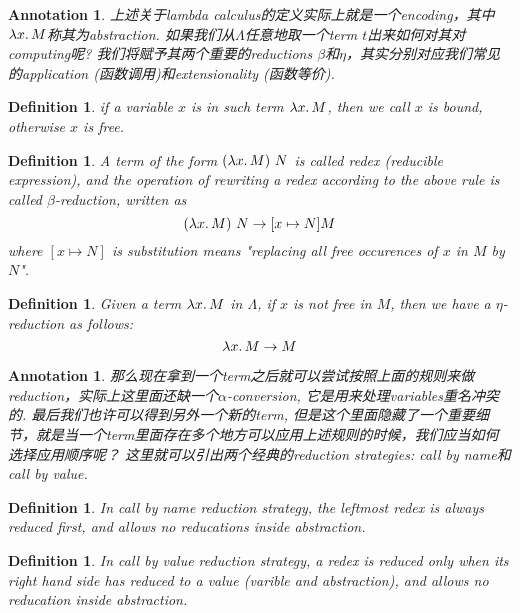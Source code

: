 \documentclass{article}
\newtheorem{definition}[theorem]{Definition}
\newtheorem{annotation}[theorem]{Annotation}
\newcommand{\lam}[2]{\ensuremath{\lambda #1\ldotp #2}} %
\begin{document}
\begin{annotation}
\rm 上述关于lambda calculus的定义实际上就是一个encoding，其中$\lam{x}{M}$称其为abstraction. 如果我们从$\Lambda$任意地取一个term $t$出来如何对其对computing呢? 我们将赋予其两个重要的reductions $\beta$和$\eta$，其实分别对应我们常见的application (函数调用)和extensionality (函数等价).
\end{annotation}

\begin{definition}
\rm if a variable $x$ is in such term $\lam{x}{M}$, then we call $x$ is bound, otherwise $x$ is free. 
\end{definition}

\begin{definition}
\rm A term of the form $(\lam{x}{M})~N$ is called redex (reducible expression), and the operation of rewriting a redex according to the above rule is called $\beta$-reduction, written as
\[
	(\lam{x}{M})~N \to [x \mapsto N] M
\]
where $[x \mapsto N]$ is substitution means "replacing all free occurences of $x$ in $M$ by $N$".
\end{definition}

\begin{definition}
\rm Given a term $\lam{x}{M}$ in $\Lambda$, if $x$ is not free in $M$, then we have a $\eta$-reduction as follows:
\[
	\lam{x}{M} \to M
\]  
\end{definition}

\begin{annotation}
\rm 那么现在拿到一个term之后就可以尝试按照上面的规则来做reduction，实际上这里面还缺一个$\alpha$-conversion, 它是用来处理variables重名冲突的. 最后我们也许可以得到另外一个新的term, 但是这个里面隐藏了一个重要细节，就是当一个term里面存在多个地方可以应用上述规则的时候，我们应当如何选择应用顺序呢？ 这里就可以引出两个经典的reduction strategies: \emph{call by name}和\emph{call by value}.
\end{annotation}

\begin{definition}
\rm In \emph{call by name} reduction strategy, the leftmost redex is always reduced first, and allows no reducations inside abstraction.  
\end{definition}

\begin{definition}
\rm In \emph{call by value} reduction strategy, a redex is reduced only when its right hand side has reduced to a \emph{value} (varible and abstraction), and allows no reducation inside abstraction.
\end{definition}
\end{document}

